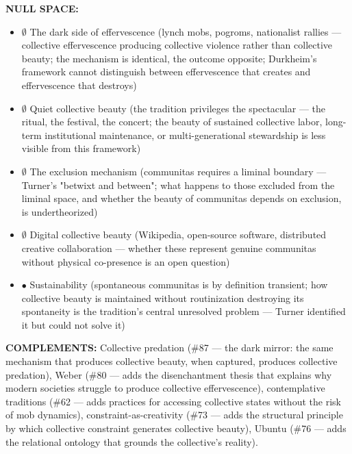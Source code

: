 \textbf{NULL SPACE:}

\begin{itemize}[nosep,leftmargin=*]
  \item $\emptyset$ The dark side of effervescence (lynch mobs, pogroms, nationalist rallies — collective effervescence producing collective violence rather than collective beauty; the mechanism is identical, the outcome opposite; Durkheim's framework cannot distinguish between effervescence that creates and effervescence that destroys)
  \item $\emptyset$ Quiet collective beauty (the tradition privileges the spectacular — the ritual, the festival, the concert; the beauty of sustained collective labor, long-term institutional maintenance, or multi-generational stewardship is less visible from this framework)
  \item $\emptyset$ The exclusion mechanism (communitas requires a liminal boundary — Turner's "betwixt and between"; what happens to those excluded from the liminal space, and whether the beauty of communitas depends on exclusion, is undertheorized)
  \item $\emptyset$ Digital collective beauty (Wikipedia, open-source software, distributed creative collaboration — whether these represent genuine communitas without physical co-presence is an open question)
  \item $\bullet$ Sustainability (spontaneous communitas is by definition transient; how collective beauty is maintained without routinization destroying its spontaneity is the tradition's central unresolved problem — Turner identified it but could not solve it)
\end{itemize}


\textbf{COMPLEMENTS:} Collective predation (\#87 — the dark mirror: the same mechanism that produces collective beauty, when captured, produces collective predation), Weber (\#80 — adds the disenchantment thesis that explains why modern societies struggle to produce collective effervescence), contemplative traditions (\#62 — adds practices for accessing collective states without the risk of mob dynamics), constraint-as-creativity (\#73 — adds the structural principle by which collective constraint generates collective beauty), Ubuntu (\#76 — adds the relational ontology that grounds the collective's reality).


